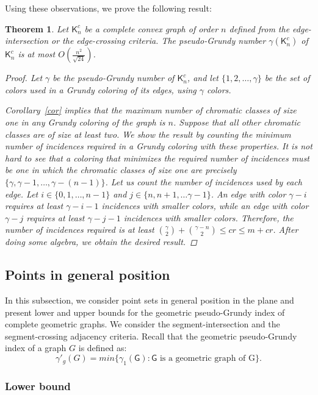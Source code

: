 \documentclass[11pt]{article}
\newtheorem{theorem}{Theorem}
\begin{document}
Using these observations, we prove the following result:

\begin{theorem}\label{thm:upper_bound}
Let $\mathsf{K}^c_n$ be a complete convex graph of order $n$ defined from the edge-intersection or the edge-crossing criteria. The pseudo-Grundy number $\gamma(\mathsf{K}^c_n)$ of $\mathsf{K}^c_n$ is at most $O(\frac{n^2}{\sqrt{24}})$.


\begin{proof}
Let $\gamma$ be the pseudo-Grundy number of $\mathsf{K}^c_n$, and let $\{1, 2, \ldots, \gamma\}$ be the set of colors used in a Grundy coloring of its edges, using $\gamma$ colors.


Corollary~\ref{cor} implies that the maximum number of chromatic classes of size one in any Grundy coloring of the graph is $n$. Suppose that all other chromatic classes are of size at least two. We show the result by counting the minimum number of incidences required in a Grundy coloring with these properties. It is not hard to see that a coloring that minimizes the required number of incidences must be one in which the chromatic classes of size one are precisely $\{\gamma, \gamma-1, \ldots, \gamma-(n-1)\}$. Let us count the number of incidences used by each edge. Let $i \in \{0, 1, \ldots, n-1\}$ and $j \in \{n, n+1, \ldots \gamma-1\}$. An edge with color $\gamma - i$ requires at least $\gamma -i -1$ incidences with smaller colors, while an edge with color $\gamma - j$ requires at least $\gamma - j - 1$ incidences with smaller colors. Therefore, the number of incidences required is at least $\binom{\gamma}{2} + \binom{\gamma-n}{2} \leq  cr \leq m + cr$. After doing some algebra, we obtain the desired result.
\end{proof}
\end{theorem}


\subsection{Points in general position} 
In this subsection, we consider point sets in general position in the plane and present lower and upper bounds for the geometric pseudo-Grundy index of complete geometric graphs. We consider the segment-intersection and the segment-crossing adjacency criteria. Recall that the geometric pseudo-Grundy index of a graph $G$ is defined as: 
$${\gamma'_g} (G) = min \{\gamma_1 (\mathsf{G}) : \mathsf{G} \text{ is a geometric graph of G}\}.$$

\subsubsection{Lower bound}
\end{document}
